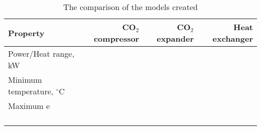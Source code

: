 \begin{table}
\label{tab:DiscussionComparison}
\caption{The comparison of the models created}
\begin{center}
\begin{tabulary}{0.9\textwidth}{LRRR}
\toprule
Property 	&	CO$_2$ compressor & CO$_2$	expander & Heat exchanger \\
\midrule
Power/Heat range, kW& & & \\
Minimum temperature, $^\circ$C& & & \\
Maximum e& & & \\
& & & \\
& & & \\
& & & \\
& & & \\
\bottomrule
\end{tabulary}
\end{center}
\end{table}